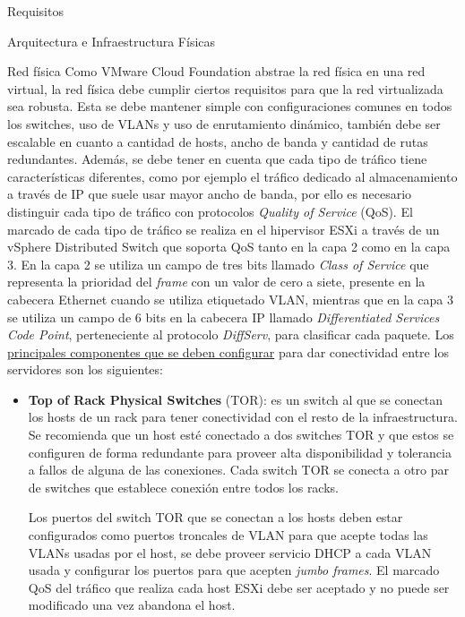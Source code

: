 \begin{section}{Requisitos}
\begin{subsection}{Arquitectura e Infraestructura Físicas \cite{CFfisInfraestuctura}}
\begin{subsubsection}{Red física}
Como VMware Cloud Foundation abstrae la red física en una red virtual, la red física debe cumplir ciertos requisitos para que la red virtualizada sea robusta. Esta se debe mantener simple con configuraciones comunes en todos los switches, uso de VLANs y uso de enrutamiento dinámico, también debe ser escalable en cuanto a cantidad de hosts, ancho de banda y cantidad de rutas redundantes. Además, se debe tener en cuenta que cada tipo de tráfico tiene características diferentes, como por ejemplo el tráfico dedicado al almacenamiento a través de IP que suele usar mayor ancho de banda, por ello es necesario distinguir cada tipo de tráfico con protocolos \textit{Quality of Service} (QoS). El marcado de cada tipo de tráfico se realiza en el hipervisor ESXi a través de un vSphere Distributed Switch que soporta QoS tanto en la capa 2 como en la capa 3. En la capa 2 se utiliza  un campo de tres bits llamado \textit{Class of Service} que representa la prioridad del \textit{frame} con un valor de cero a siete, presente en la cabecera Ethernet cuando se utiliza etiquetado VLAN, mientras que en la capa 3 se utiliza un campo de 6 bits en la cabecera IP llamado \textit{Differentiated Services Code Point}, perteneciente al protocolo \textit{DiffServ}, para clasificar cada paquete. Los \underline{principales componentes que se deben configurar} para dar conectividad entre los servidores son los siguientes:
\begin{itemize}
    \item \textbf{Top of Rack Physical Switches} (TOR): es un switch al que se conectan los hosts de un rack para tener conectividad con el resto de la infraestructura. Se recomienda que un host esté conectado a dos switches TOR y que estos se configuren de forma redundante para proveer alta disponibilidad y tolerancia a fallos de alguna de las conexiones. Cada switch TOR se conecta a otro par de switches que establece conexión entre todos los racks.
    
    Los puertos del switch TOR que se conectan a los hosts deben estar configurados como puertos troncales de VLAN para que acepte todas las VLANs usadas por el host, se debe proveer servicio DHCP a cada VLAN usada y configurar los puertos para que acepten \textit{jumbo frames}. El marcado QoS del tráfico que realiza cada host ESXi debe ser aceptado y no puede ser modificado una vez abandona el host. 
    

\end{itemize}
\end{subsubsection}
\end{subsection}
\end{section}
